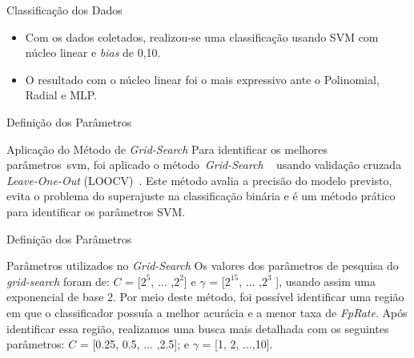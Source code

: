 \documentclass{beamer}
\begin{document}
\begin{frame}{Classificação dos Dados}
	\begin{block}{}
		\begin{itemize}[<+->]
			\item	Com os dados coletados, realizou-se uma classificação usando SVM com núcleo linear e \textit{bias} de 0,10.
			\item	O resultado com o núcleo linear foi o mais expressivo ante o Polinomial, Radial e MLP.
		\end{itemize}
	\end{block}
\end{frame}

\begin{frame}{Definição dos Parâmetros}
 \begin{block}{Aplicação do Método de \textit{Grid-Search}}
 Para identificar os melhores parâmetros~\ac{svm}, foi aplicado o método~\textit{Grid-Search} ~\cite{gridsearchsvm2010} usando validação cruzada \textit{Leave-One-Out} (LOOCV)~\cite{kantardzic2011data}. Este método avalia a precisão do modelo previsto, evita o problema do superajuste na classificação binária e é um método prático para identificar os parâmetros SVM.  
 \end{block}
\end{frame}

\begin{frame}{Definição dos Parâmetros}
 \begin{block}{Parâmetros utilizados no \textit{Grid-Search}}
    Os valores dos parâmetros de pesquisa do \textit{grid-search} foram de: $C$ = [$2^5$, ... ,$2^2$] e $\gamma$ = [$2^{15}$, ... ,$2^3$ ], usando assim uma exponencial de base 2. Por meio deste método, foi possível identificar uma região em que o classificador possuía a melhor acurácia e a menor taxa de \textit{FpRate}. Após identificar essa região, realizamos uma busca mais detalhada com os seguintes parâmetros: $C$ = [0.25, 0.5, ... ,2.5]; e $\gamma$ = [1, 2, ...,10].
 \end{block}
\end{frame}
\end{document}
